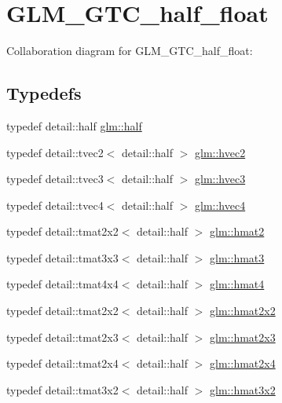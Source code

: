 \hypertarget{group__gtc__half__float}{}\section{G\+L\+M\+\_\+\+G\+T\+C\+\_\+half\+\_\+float}
\label{group__gtc__half__float}
Collaboration diagram for G\+L\+M\+\_\+\+G\+T\+C\+\_\+half\+\_\+float\+:
\subsection*{Typedefs}
\begin{DoxyCompactItemize}
\item 
typedef detail\+::half \hyperlink{group__gtc__half__float_gadae4de950aa2230455634615b782c151}{glm\+::half}
\item 
typedef detail\+::tvec2$<$ detail\+::half $>$ \hyperlink{group__gtc__half__float_gafad70a9362e123cafc2807e93c292173}{glm\+::hvec2}
\item 
typedef detail\+::tvec3$<$ detail\+::half $>$ \hyperlink{group__gtc__half__float_ga7f3d584efe4e61946fb06ce920b6919f}{glm\+::hvec3}
\item 
typedef detail\+::tvec4$<$ detail\+::half $>$ \hyperlink{group__gtc__half__float_ga377f6d7c1e25bda8eb1393f5cc74acd4}{glm\+::hvec4}
\item 
typedef detail\+::tmat2x2$<$ detail\+::half $>$ \hyperlink{group__gtc__half__float_gaf5adf0fe534e1e97f0f162805c1a4dba}{glm\+::hmat2}
\item 
typedef detail\+::tmat3x3$<$ detail\+::half $>$ \hyperlink{group__gtc__half__float_gacbd67f9ac28573409d5d1eede2ec0fcd}{glm\+::hmat3}
\item 
typedef detail\+::tmat4x4$<$ detail\+::half $>$ \hyperlink{group__gtc__half__float_gaf5091515fa8c775f1e511d1e6790e968}{glm\+::hmat4}
\item 
typedef detail\+::tmat2x2$<$ detail\+::half $>$ \hyperlink{group__gtc__half__float_ga8de844783e98b26f2d0f1be5dced0d43}{glm\+::hmat2x2}
\item 
typedef detail\+::tmat2x3$<$ detail\+::half $>$ \hyperlink{group__gtc__half__float_ga620d92d90c323bb52a5a3c4df9b44bda}{glm\+::hmat2x3}
\item 
typedef detail\+::tmat2x4$<$ detail\+::half $>$ \hyperlink{group__gtc__half__float_gae4525d297f7612882ac1e58ad938ac10}{glm\+::hmat2x4}
\item 
typedef detail\+::tmat3x2$<$ detail\+::half $>$ \hyperlink{group__gtc__half__float_ga70ae0376caa86bce1c8df390c7211321}{glm\+::hmat3x2}

\end{DoxyCompactItemize}

